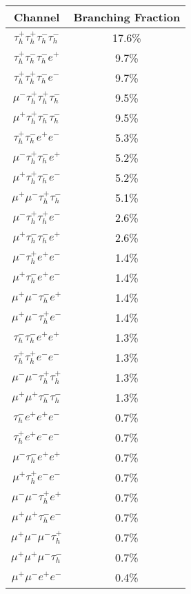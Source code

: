 \begin{table}[h]
    \centering
    \begin{tabular}{|c|c|}
         \hline
         Channel & Branching Fraction  \\
         \hline
         \hline
$\tau_h^{+}\tau_h^{+}\tau_h^{-}\tau_h^{-}$ & 17.6\% \\
$\tau_h^{+}\tau_h^{-}\tau_h^{-}e^{+}$ & 9.7\% \\
$\tau_h^{+}\tau_h^{+}\tau_h^{-}e^{-}$ & 9.7\% \\
$\mu^{-}\tau_h^{+}\tau_h^{+}\tau_h^{-}$ & 9.5\% \\
$\mu^{+}\tau_h^{+}\tau_h^{-}\tau_h^{-}$ & 9.5\% \\
$\tau_h^{+}\tau_h^{-}e^{+}e^{-}$ & 5.3\% \\
$\mu^{-}\tau_h^{+}\tau_h^{-}e^{+}$ & 5.2\% \\
$\mu^{+}\tau_h^{+}\tau_h^{-}e^{-}$ & 5.2\% \\
$\mu^{+}\mu^{-}\tau_h^{+}\tau_h^{-}$ & 5.1\% \\
$\mu^{-}\tau_h^{+}\tau_h^{+}e^{-}$ & 2.6\% \\
$\mu^{+}\tau_h^{-}\tau_h^{-}e^{+}$ & 2.6\% \\
$\mu^{-}\tau_h^{+}e^{+}e^{-}$ & 1.4\% \\
$\mu^{+}\tau_h^{-}e^{+}e^{-}$ & 1.4\% \\
$\mu^{+}\mu^{-}\tau_h^{-}e^{+}$ & 1.4\% \\
$\mu^{+}\mu^{-}\tau_h^{+}e^{-}$ & 1.4\% \\
$\tau_h^{-}\tau_h^{-}e^{+}e^{+}$ & 1.3\% \\
$\tau_h^{+}\tau_h^{+}e^{-}e^{-}$ & 1.3\% \\
$\mu^{-}\mu^{-}\tau_h^{+}\tau_h^{+}$ & 1.3\% \\
$\mu^{+}\mu^{+}\tau_h^{-}\tau_h^{-}$ & 1.3\% \\
$\tau_h^{-}e^{+}e^{+}e^{-}$ & 0.7\% \\
$\tau_h^{+}e^{+}e^{-}e^{-}$ & 0.7\% \\
$\mu^{-}\tau_h^{-}e^{+}e^{+}$ & 0.7\% \\
$\mu^{+}\tau_h^{+}e^{-}e^{-}$ & 0.7\% \\
$\mu^{-}\mu^{-}\tau_h^{+}e^{+}$ & 0.7\% \\
$\mu^{+}\mu^{+}\tau_h^{-}e^{-}$ & 0.7\% \\
$\mu^{+}\mu^{-}\mu^{-}\tau_h^{+}$ & 0.7\% \\
$\mu^{+}\mu^{+}\mu^{-}\tau_h^{-}$ & 0.7\% \\
$\mu^{+}\mu^{-}e^{+}e^{-}$ & 0.4\% \\

\end{tabular}
\end{table}
